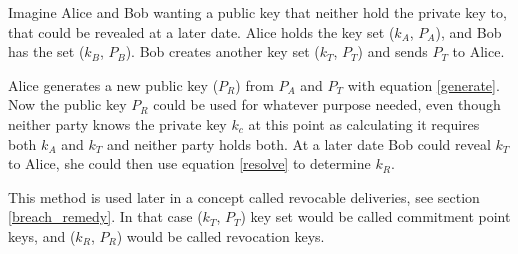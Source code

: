 Imagine Alice and Bob wanting a public key that neither hold the private key to, that could be revealed at a later date. Alice holds the key set ($k_A$, $P_A$), and Bob has the set ($k_B$, $P_B$). Bob creates another key set ($k_T$, $P_T$) and sends $P_T$ to Alice.

Alice generates a new public key ($P_R$) from $P_A$ and $P_T$ with equation \ref{generate}. Now the public key $P_R$ could be used for whatever purpose needed, even though neither party knows the private key $k_c$ at this point as calculating it requires both $k_A$ and $k_T$ and neither party holds both. At a later date Bob could reveal $k_T$ to Alice, she could then use equation \ref{resolve} to determine $k_R$.\cite{bolt}

This method is used later in a concept called revocable deliveries, see section \ref{breach_remedy}. In that case ($k_T$, $P_T$) key set would be called commitment point keys, and ($k_R$, $P_R$) would be called revocation keys.\cite{bolt}